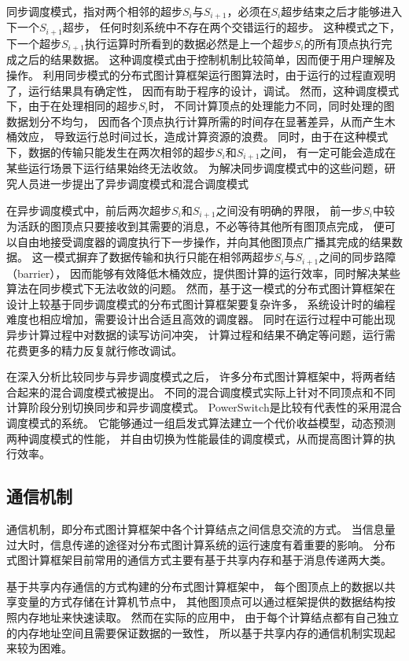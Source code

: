 同步调度模式，指对两个相邻的超步$S_i$与$S_{i+1}$，必须在$S_i$超步结束之后才能够进入下一个$S_{i+1}$超步，
任何时刻系统中不存在两个交错运行的超步。
这种模式之下，下一个超步$S_{i+1}$执行运算时所看到的数据必然是上一个超步$S_i$的所有顶点执行完成之后的结果数据。
这种调度模式由于控制机制比较简单，因而便于用户理解及操作。
利用同步模式的分布式图计算框架运行图算法时，由于运行的过程直观明了，运行结果具有确定性，
因而有助于程序的设计，调试。
然而，这种调度模式下，由于在处理相同的超步$S_i$时，
不同计算顶点的处理能力不同，同时处理的图数据划分不均匀，
因而各个顶点执行计算所需的时间存在显著差异，从而产生木桶效应，
导致运行总时间过长，造成计算资源的浪费。
同时，由于在这种模式下，数据的传输只能发生在两次相邻的超步$S_i$和$S_{i+1}$之间，
有一定可能会造成在某些运行场景下运行结果始终无法收敛。
为解决同步调度模式中的这些问题，研究人员进一步提出了异步调度模式和混合调度模式


在异步调度模式中，前后两次超步$S_i$和$S_{i+1}$之间没有明确的界限，
前一步$S_i$中较为活跃的图顶点只要接收到其需要的消息，不必等待其他所有图顶点完成，
便可以自由地接受调度器的调度执行下一步操作，并向其他图顶点广播其完成的结果数据。
这一模式摒弃了数据传输和执行只能在相邻两超步$S_i$与$S_{i+1}$之间的同步路障（barrier），
因而能够有效降低木桶效应，提供图计算的运行效率，同时解决某些算法在同步模式下无法收敛的问题。
然而，基于这一模式的分布式图计算框架在设计上较基于同步调度模式的分布式图计算框架要复杂许多，
系统设计时的编程难度也相应增加，需要设计出合适且高效的调度器。
同时在运行过程中可能出现异步计算过程中对数据的读写访问冲突，
计算过程和结果不确定等问题，运行需花费更多的精力反复就行修改调试。

在深入分析比较同步与异步调度模式之后，
许多分布式图计算框架中，将两者结合起来的混合调度模式被提出。
不同的混合调度模式实际上针对不同顶点和不同计算阶段分别切换同步和异步调度模式。
PowerSwitch\cite{Xie@PPoPP15}是比较有代表性的采用混合调度模式的系统。
它能够通过一组启发式算法建立一个代价收益模型，动态预测两种调度模式的性能，
并自由切换为性能最佳的调度模式，从而提高图计算的执行效率。

\subsection{通信机制}

通信机制，即分布式图计算框架中各个计算结点之间信息交流的方式。
当信息量过大时，信息传递的途径对分布式图计算系统的运行速度有着重要的影响。
分布式图计算框架目前常用的通信方式主要有基于共享内存和基于消息传递两大类。

基于共享内存通信的方式构建的分布式图计算框架中，
每个图顶点上的数据以共享变量的方式存储在计算机节点中，
其他图顶点可以通过框架提供的数据结构按照内存地址来快速读取。
然而在实际的应用中，
由于每个计算结点都有自己独立的内存地址空间且需要保证数据的一致性，
所以基于共享内存的通信机制实现起来较为困难。

